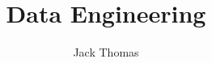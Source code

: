 \documentclass[]{report}
\begin{document}
\title{Data Engineering}
\author{Jack Thomas}
\date{}

\maketitle
\newpage

\tableofcontents
\newpage



\end{document}

